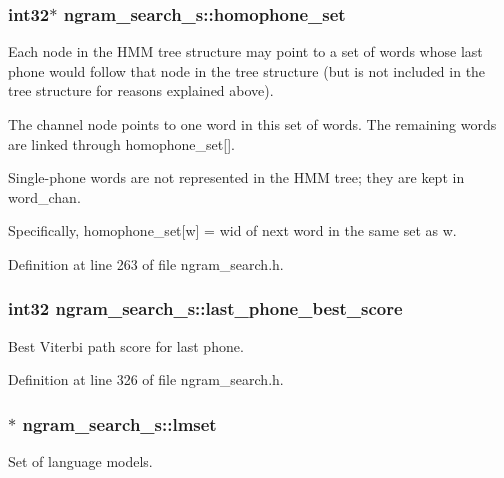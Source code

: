 \subsubsection[{homophone\-\_\-set}]{\setlength{\rightskip}{0pt plus 5cm}int32$\ast$ ngram\-\_\-search\-\_\-s\-::homophone\-\_\-set}\label{structngram__search__s_ab251bb3d0ddd33dd99ed390b61e481f2}


Each node in the H\-M\-M tree structure may point to a set of words whose last phone would follow that node in the tree structure (but is not included in the tree structure for reasons explained above). 

The channel node points to one word in this set of words. The remaining words are linked through homophone\-\_\-set[].

Single-\/phone words are not represented in the H\-M\-M tree; they are kept in word\-\_\-chan.

Specifically, homophone\-\_\-set[w] = wid of next word in the same set as w. 

Definition at line 263 of file ngram\-\_\-search.\-h.

\subsubsection[{last\-\_\-phone\-\_\-best\-\_\-score}]{\setlength{\rightskip}{0pt plus 5cm}int32 ngram\-\_\-search\-\_\-s\-::last\-\_\-phone\-\_\-best\-\_\-score}\label{structngram__search__s_a81ee45f3c184568e2b5f8b79c58e0b9e}


Best Viterbi path score for last phone. 



Definition at line 326 of file ngram\-\_\-search.\-h.

\subsubsection[{lmset}]{$\ast$ ngram\-\_\-search\-\_\-s\-::lmset}\label{structngram__search__s_a6127a6d8fb53832e67456c11aa6ad9c4}


Set of language models. 



